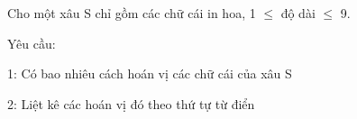 Cho một xâu S chỉ gồm các chữ cái in hoa, 1  $\le$  độ dài  $\le$  9.  

   Yêu cầu:  

   1: Có bao nhiêu cách hoán vị các chữ cái của xâu S  

   2: Liệt kê các hoán vị đó theo thứ tự từ điển